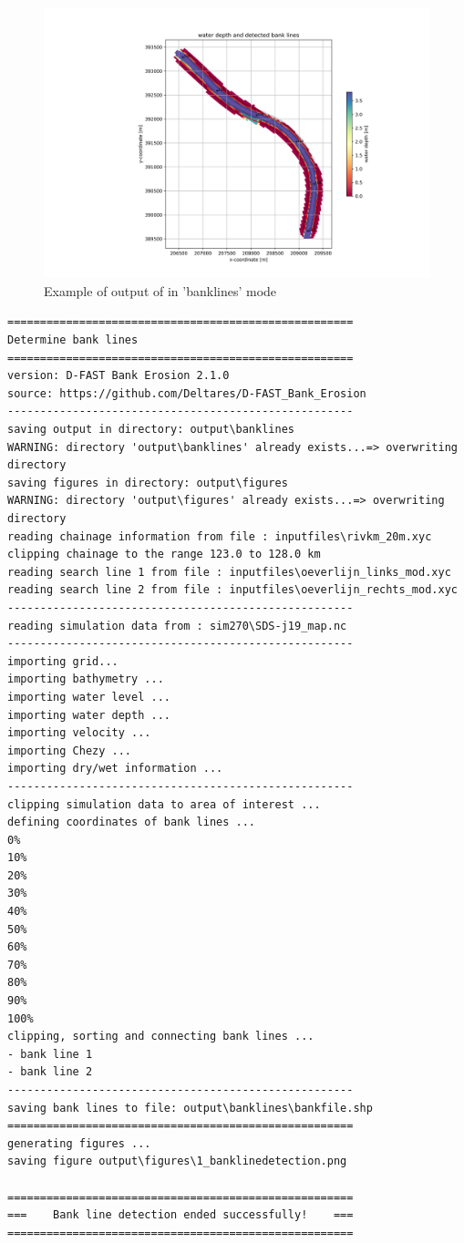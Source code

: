 \begin{figure}
\includegraphics[width=\textwidth]{figures/1_banklinedetection.png}
\caption{Example of output of \dfastbe in 'banklines' mode}
\label{Fig2.2}
\end{figure}

\begin{Verbatim}
=====================================================
Determine bank lines
=====================================================
version: D-FAST Bank Erosion 2.1.0
source: https://github.com/Deltares/D-FAST_Bank_Erosion
-----------------------------------------------------
saving output in directory: output\banklines
WARNING: directory 'output\banklines' already exists...=> overwriting directory
saving figures in directory: output\figures
WARNING: directory 'output\figures' already exists...=> overwriting directory
reading chainage information from file : inputfiles\rivkm_20m.xyc
clipping chainage to the range 123.0 to 128.0 km
reading search line 1 from file : inputfiles\oeverlijn_links_mod.xyc
reading search line 2 from file : inputfiles\oeverlijn_rechts_mod.xyc
-----------------------------------------------------
reading simulation data from : sim270\SDS-j19_map.nc
-----------------------------------------------------
importing grid...
importing bathymetry ...
importing water level ...
importing water depth ...
importing velocity ...
importing Chezy ...
importing dry/wet information ...
-----------------------------------------------------
clipping simulation data to area of interest ...
defining coordinates of bank lines ...
0%
10%
20%
30%
40%
50%
60%
70%
80%
90%
100%
clipping, sorting and connecting bank lines ...
- bank line 1
- bank line 2
-----------------------------------------------------
saving bank lines to file: output\banklines\bankfile.shp
=====================================================
generating figures ...
saving figure output\figures\1_banklinedetection.png

=====================================================
===    Bank line detection ended successfully!    ===
=====================================================
\end{Verbatim}

